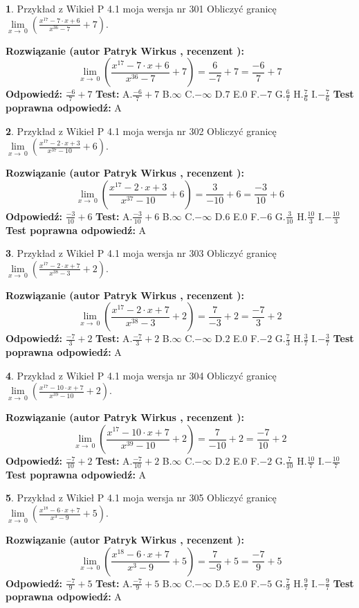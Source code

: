 \documentclass[12pt, a4paper]{article}
\theoremstyle{definition} %
\newtheorem{zad}{}
\newcommand{\zadStart}[1]{\begin{zad}#1\newline}
\newcommand{\zadStop}{\end{zad}}
\newcommand{\rozwStart}[2]{\noindent \textbf{Rozwiązanie (autor #1 , recenzent #2): }\newline}
\newcommand{\rozwStop}{\newline}
\newcommand{\odpStart}{\noindent \textbf{Odpowiedź:}\newline}
\newcommand{\odpStop}{\newline}
\newcommand{\testStart}{\noindent \textbf{Test:}\newline}
\newcommand{\testStop}{\newline}
\newcommand{\kluczStart}{\noindent \textbf{Test poprawna odpowiedź:}\newline}
\newcommand{\kluczStop}{\newline}
\begin{document}
\zadStart{Przykład z Wikieł P 4.1 moja wersja nr 301}
Obliczyć granicę $\lim\limits_{x\to\ 0}(\frac{x^{17}-7 \cdot x +6}{x^{36}-7}+7)$.
\zadStop
\rozwStart{Patryk Wirkus}{}
$$\lim\limits_{x\to\ 0}(\frac{x^{17}-7 \cdot x +6}{x^{36}-7}+7)=\frac{6}{-7}+7=\frac{-6}{7}+7$$
\rozwStop
\odpStart
$\frac{-6}{7}+7$
\odpStop
\testStart
A.$\frac{-6}{7}+7$
B.$\infty$
C.$-\infty$
D.$7$
E.$0$
F.$-7$
G.$\frac{6}{7}$
H.$\frac{7}{6}$
I.$-\frac{7}{6}$
\testStop
\kluczStart
A
\kluczStop



\zadStart{Przykład z Wikieł P 4.1 moja wersja nr 302}
Obliczyć granicę $\lim\limits_{x\to\ 0}(\frac{x^{17}-2 \cdot x +3}{x^{37}-10}+6)$.
\zadStop
\rozwStart{Patryk Wirkus}{}
$$\lim\limits_{x\to\ 0}(\frac{x^{17}-2 \cdot x +3}{x^{37}-10}+6)=\frac{3}{-10}+6=\frac{-3}{10}+6$$
\rozwStop
\odpStart
$\frac{-3}{10}+6$
\odpStop
\testStart
A.$\frac{-3}{10}+6$
B.$\infty$
C.$-\infty$
D.$6$
E.$0$
F.$-6$
G.$\frac{3}{10}$
H.$\frac{10}{3}$
I.$-\frac{10}{3}$
\testStop
\kluczStart
A
\kluczStop



\zadStart{Przykład z Wikieł P 4.1 moja wersja nr 303}
Obliczyć granicę $\lim\limits_{x\to\ 0}(\frac{x^{17}-2 \cdot x +7}{x^{38}-3}+2)$.
\zadStop
\rozwStart{Patryk Wirkus}{}
$$\lim\limits_{x\to\ 0}(\frac{x^{17}-2 \cdot x +7}{x^{38}-3}+2)=\frac{7}{-3}+2=\frac{-7}{3}+2$$
\rozwStop
\odpStart
$\frac{-7}{3}+2$
\odpStop
\testStart
A.$\frac{-7}{3}+2$
B.$\infty$
C.$-\infty$
D.$2$
E.$0$
F.$-2$
G.$\frac{7}{3}$
H.$\frac{3}{7}$
I.$-\frac{3}{7}$
\testStop
\kluczStart
A
\kluczStop



\zadStart{Przykład z Wikieł P 4.1 moja wersja nr 304}
Obliczyć granicę $\lim\limits_{x\to\ 0}(\frac{x^{17}-10 \cdot x +7}{x^{39}-10}+2)$.
\zadStop
\rozwStart{Patryk Wirkus}{}
$$\lim\limits_{x\to\ 0}(\frac{x^{17}-10 \cdot x +7}{x^{39}-10}+2)=\frac{7}{-10}+2=\frac{-7}{10}+2$$
\rozwStop
\odpStart
$\frac{-7}{10}+2$
\odpStop
\testStart
A.$\frac{-7}{10}+2$
B.$\infty$
C.$-\infty$
D.$2$
E.$0$
F.$-2$
G.$\frac{7}{10}$
H.$\frac{10}{7}$
I.$-\frac{10}{7}$
\testStop
\kluczStart
A
\kluczStop



\zadStart{Przykład z Wikieł P 4.1 moja wersja nr 305}
Obliczyć granicę $\lim\limits_{x\to\ 0}(\frac{x^{18}-6 \cdot x +7}{x^{3}-9}+5)$.
\zadStop
\rozwStart{Patryk Wirkus}{}
$$\lim\limits_{x\to\ 0}(\frac{x^{18}-6 \cdot x +7}{x^{3}-9}+5)=\frac{7}{-9}+5=\frac{-7}{9}+5$$
\rozwStop
\odpStart
$\frac{-7}{9}+5$
\odpStop
\testStart
A.$\frac{-7}{9}+5$
B.$\infty$
C.$-\infty$
D.$5$
E.$0$
F.$-5$
G.$\frac{7}{9}$
H.$\frac{9}{7}$
I.$-\frac{9}{7}$
\testStop
\kluczStart
A
\kluczStop
\end{document}
